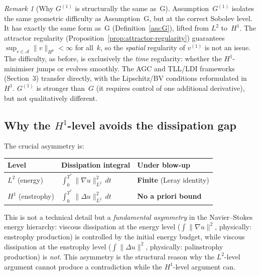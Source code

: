 \documentclass[12pt,a4paper]{article}
\theoremstyle{definition}
\theoremstyle{plain}
\theoremstyle{remark}
\newtheorem{remark}[definition]{Remark}
\begin{document}
\begin{remark}[Why $G^{(1)}$ is structurally the same as~G]
Assumption~$G^{(1)}$ isolates the same geometric difficulty as
Assumption~G, but at the correct Sobolev level.
It has exactly the same form as~G
(Definition~\ref{ass:G}), lifted from $L^2$ to~$H^1$.  The
attractor regularity
(Proposition~\ref{prop:attractor-regularity}) guarantees
$\sup_{v \in \mathcal{A}}\|v\|_{H^k} < \infty$ for all~$k$,
so the \emph{spatial} regularity of $v^{(1)}$ is not an issue.
The difficulty, as before, is exclusively the \emph{time}
regularity: whether the $H^1$-minimiser jumps or evolves smoothly.
The AGC and TLL/LDI frameworks (Section~3) transfer directly, with
the Lipschitz/BV conditions reformulated in~$H^1$.
$G^{(1)}$ is stronger than~$G$ (it requires control of one
additional derivative), but not qualitatively different.
\end{remark}

\subsection{Why the $H^1$-level avoids the dissipation gap}

The crucial asymmetry is:

\begin{center}
\begin{tabular}{lll}
\hline
\textbf{Level} & \textbf{Dissipation integral} & \textbf{Under blow-up} \\
\hline
$L^2$\; (energy)
  & $\int_0^{T^*}\|\nabla u\|_{L^2}^2\,dt$
  & \textbf{Finite} (Leray identity) \\
$H^1$\; (enstrophy)
  & $\int_0^{T^*}\|\Delta u\|_{L^2}^2\,dt$
  & \textbf{No a priori bound} \\
\hline
\end{tabular}
\end{center}

\noindent
This is not a technical detail but a \emph{fundamental asymmetry}
in the Navier--Stokes energy hierarchy: viscous dissipation at the
energy level ($\int\|\nabla u\|^2$, physically: enstrophy production)
is controlled by the initial energy budget, while viscous dissipation
at the enstrophy level ($\int\|\Delta u\|^2$, physically: palinstrophy
production) is \emph{not}.  This asymmetry is the structural reason
why the $L^2$-level argument cannot produce a contradiction while the
$H^1$-level argument can.
\end{document}
